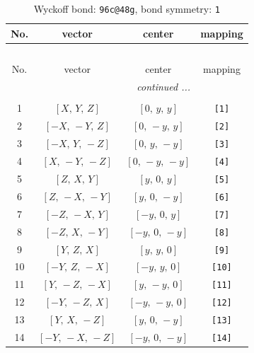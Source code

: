 \documentclass[fleqn,8pt]{jsarticle}
\begin{document}
\begin{longtable}{cccc}
\caption{Wyckoff bond: {\tt 96c@48g}, bond symmetry: {\tt 1}}
 \\
 \hline \hline
No. & vector & center & mapping \\ \hline \endfirsthead

\multicolumn{3}{l}{\tablename\ \thetable{}} \\
 \hline \hline
No. & vector & center & mapping \\ \hline \endhead

 \hline \hline
\multicolumn{3}{r}{\footnotesize\it continued ...} \\ \endfoot

 \hline \hline
\multicolumn{3}{r}{} \\ \endlastfoot

1 & $\left[ X,\, Y,\, Z \right]$ & $\left[ 0,\, y,\, y \right]$ & {\tt [1]} \\ \hline
2 & $\left[ - X,\, - Y,\, Z \right]$ & $\left[ 0,\, - y,\, y \right]$ & {\tt [2]} \\ \hline
3 & $\left[ - X,\, Y,\, - Z \right]$ & $\left[ 0,\, y,\, - y \right]$ & {\tt [3]} \\ \hline
4 & $\left[ X,\, - Y,\, - Z \right]$ & $\left[ 0,\, - y,\, - y \right]$ & {\tt [4]} \\ \hline
5 & $\left[ Z,\, X,\, Y \right]$ & $\left[ y,\, 0,\, y \right]$ & {\tt [5]} \\ \hline
6 & $\left[ Z,\, - X,\, - Y \right]$ & $\left[ y,\, 0,\, - y \right]$ & {\tt [6]} \\ \hline
7 & $\left[ - Z,\, - X,\, Y \right]$ & $\left[ - y,\, 0,\, y \right]$ & {\tt [7]} \\ \hline
8 & $\left[ - Z,\, X,\, - Y \right]$ & $\left[ - y,\, 0,\, - y \right]$ & {\tt [8]} \\ \hline
9 & $\left[ Y,\, Z,\, X \right]$ & $\left[ y,\, y,\, 0 \right]$ & {\tt [9]} \\ \hline
10 & $\left[ - Y,\, Z,\, - X \right]$ & $\left[ - y,\, y,\, 0 \right]$ & {\tt [10]} \\ \hline
11 & $\left[ Y,\, - Z,\, - X \right]$ & $\left[ y,\, - y,\, 0 \right]$ & {\tt [11]} \\ \hline
12 & $\left[ - Y,\, - Z,\, X \right]$ & $\left[ - y,\, - y,\, 0 \right]$ & {\tt [12]} \\ \hline
13 & $\left[ Y,\, X,\, - Z \right]$ & $\left[ y,\, 0,\, - y \right]$ & {\tt [13]} \\ \hline
14 & $\left[ - Y,\, - X,\, - Z \right]$ & $\left[ - y,\, 0,\, - y \right]$ & {\tt [14]} \\ \hline

\end{longtable}
\end{document}
